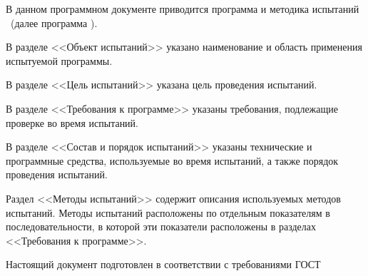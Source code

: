 \newpage\annotation

В данном программном документе приводится программа и методика испытаний \programname\ (далее программа \productname).

В разделе <<Объект испытаний>> указано наименование и область применения испытуемой программы.

В разделе <<Цель испытаний>> указана цель проведения испытаний.

В разделе <<Требования к программе>> указаны требования, подлежащие проверке во время испытаний.

В разделе <<Состав и порядок испытаний>> указаны технические и программные средства, используемые во время испытаний, а также порядок проведения испытаний.

Раздел <<Методы испытаний>> содержит описания используемых методов испытаний. Методы испытаний расположены по отдельным показателям в последовательности, в которой эти показатели расположены в разделах <<Требования к программе>>.

Настоящий документ подготовлен в соответствии с требованиями ГОСТ~\cite{gost19301}
